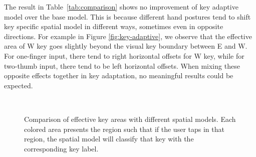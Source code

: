 \documentclass{sigchi}
\begin{document}
The result in Table~\ref{tab:comparison} shows no improvement of key adaptive model over the base model. This is because different hand postures tend to shift key specific spatial model in different ways, sometimes even in opposite directions. For example in Figure \ref{fig:key-adaptive}, we observe that the effective area of W key goes slightly beyond the visual key boundary between E and W. For one-finger input, there tend to right horizontal offsets for W key, while for two-thumb input, there tend to be left horizontal offsets. When mixing these opposite effects together in key adaptation, no meaningful results could be expected.

\begin{figure}[tb]
  \centering
   ~
  \caption{Comparison of effective key areas with different spatial models.  Each colored area presents the region such that if the user taps in that region, the spatial model will classify that key with the corresponding key label.}
  \label{fig:key-boundary}
\end{figure}
\end{document}
